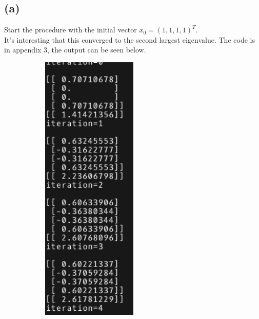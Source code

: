 \documentclass{article}
\begin{document}
\subsection*{(a)}
Start the procedure with the initial vector $x_0=(1,1,1,1)^T$.\\
It's interesting that this converged to the second largest eigenvalue. The code is in appendix 3, the output can be seen below.
\begin{figure}[H]
    \centering
    \begin{subfigure}[b]{0.5\textwidth}
        \includegraphics[width=0.5\textwidth]{p3a.png}
    \end{subfigure}
    \begin{subfigure}[b]{0.49\textwidth}

\end{subfigure}
\end{figure}
\end{document}
